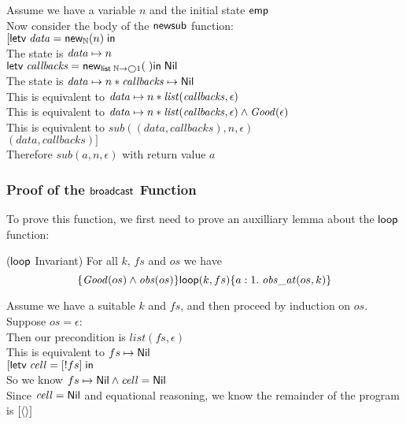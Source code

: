 \begin{tabbedproof}
\oo Assume we have a variable $n$ and the initial state $\mathsf{emp}$\\
\ooo Now consider the body of the $\mathsf{newsub}$ function: \\
\ooo $[\mathsf{letv}\;\mathit{data} = \mathsf{new}_{\mathbb{N}}(n)\;\mathsf{in}\;$ \\
\ooo The state is $\mathit{data} \mapsto n$ \\
\ooo $\mathsf{letv}\;\mathit{callbacks} = \mathsf{new}_{\mathsf{list}\;{\mathbb{N}\to\bigcirc{1}}}(\;)\mathsf{in}\;\mathsf{Nil}{}$ \\
\ooo The state is $\mathit{data} \mapsto n * \mathit{callbacks} \mapsto \mathsf{Nil}$ \\
\ooo This is equivalent to $\mathit{data} \mapsto n * \mathit{list}(\mathit{callbacks}, \epsilon)$ \\
\ooo This is equivalent to $\mathit{data} \mapsto n * \mathit{list}(\mathit{callbacks}, \epsilon) \land \mathit{Good}(\epsilon)$ \\
\ooo This is equivalent to $\mathit{sub}(\mathit{(data,callbacks)}, n, \epsilon)$ \\
\ooo $(data, callbacks)]$ \\
\ooo Therefore $\mathit{sub}(a, n, \epsilon)$ with return value $a$ \\
\end{tabbedproof}

\subsubsection{Proof of the $\mathsf{broadcast}$ Function}

To prove this function, we first need to prove an auxilliary lemma about the $\mathsf{loop}$ function:

\begin{lemma}{($\mathsf{loop}$ Invariant)}
For all $k$, $fs$  and $os$ we have
\begin{displaymath}
\{{\mathit{Good}(os) \land \mathit{obs}(os)}\}{\mathsf{loop}(k, fs)}\{{a:1}.\;{\mathit{obs\_at}(os, k)}\}
\end{displaymath}
\end{lemma}

\begin{tabbedproof}
\oo Assume we have a suitable $k$ and $fs$, and then proceed by induction on $os$.  \\
\oo Suppose $os = \epsilon$:  \\
\ooo Then our precondition is $\mathit{list}(fs, \epsilon)$ \\
\ooo This is equivalent to $fs \mapsto \mathsf{Nil}$ \\
\ooo $[\mathsf{letv}\;\mathit{cell} = [!fs]\;\mathsf{in}\;$  \\
\ooo So we know $fs \mapsto \mathsf{Nil} \land \mathit{cell} = \mathsf{Nil}$ \\
\ooo Since $\mathit{cell} = \mathsf{Nil}$ and equational reasoning, we know the remainder of the program is $[\left<\right>]$
\end{tabbedproof}


